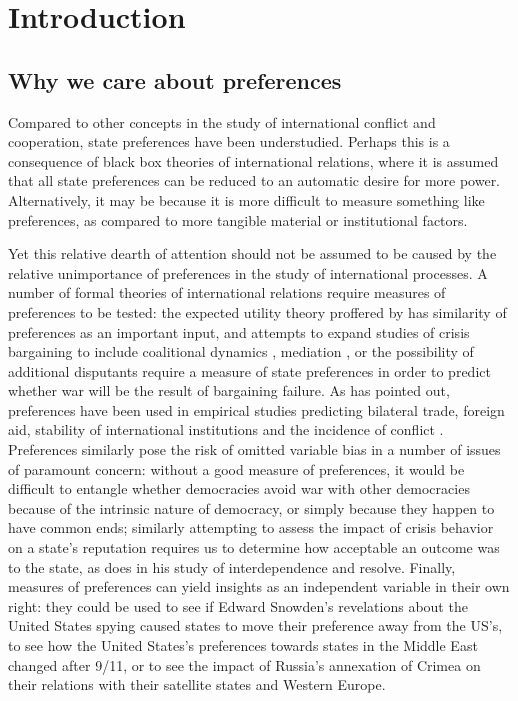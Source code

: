 \setcounter{section}{1}
\section{Introduction}
\subsection{Why we care about preferences}
Compared to other concepts in the study of international conflict and cooperation, state preferences have been understudied. Perhaps this is a consequence of black box theories of international relations, where it is assumed that all state preferences can be reduced to an automatic desire for more power. Alternatively, it may be because it is more difficult to measure something like preferences, as compared to more tangible material or institutional factors.

Yet this relative dearth of attention should not be assumed to be caused by the relative unimportance of preferences in the study of international processes. A number of formal theories of international relations require measures of preferences to be tested: the expected utility theory proffered by \citep{WarTrap} has similarity of preferences as an important input, and attempts to expand studies of crisis bargaining to include coalitional dynamics \citep{wolford:2014}, mediation \citep{kydd:year}, or the possibility of additional disputants \citep{gallop:2014} require a measure of state preferences in order to predict whether war will be the result of bargaining failure. As \citet{hage:2011} has pointed out, preferences have been used in empirical studies predicting bilateral trade, foreign aid, stability of international institutions and the incidence of conflict \citep{kastner:2007, derouen:heo:2004, stone:2004, gartzke:2007, braumoeller:2008}. Preferences similarly pose the risk of omitted variable bias in a number of issues of paramount concern: without a good measure of preferences, it would be difficult to entangle whether democracies avoid war with other democracies because of the intrinsic nature of democracy, or simply because they happen to have common ends; similarly attempting to assess the impact of crisis behavior on a state's reputation requires us to determine how acceptable an outcome was to the state, as \citep{crescenzi:200X} does in his study of interdependence and resolve. Finally, measures of preferences can yield insights as an independent variable in their own right: they could be used to see if Edward Snowden's revelations about the United States spying caused states to move their preference away from the US's, to see how the United States's preferences towards states in the Middle East changed after 9/11, or to see the impact of Russia's annexation of Crimea on their relations with their satellite states and Western Europe.

